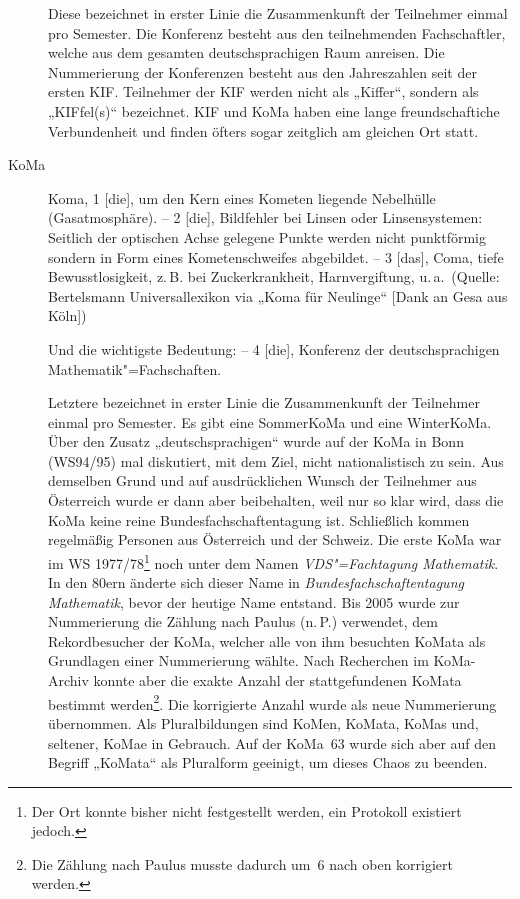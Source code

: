 \begin{description}
	Diese bezeichnet in erster Linie die Zusammenkunft der Teilnehmer einmal
	pro Semester. Die Konferenz besteht aus den teilnehmenden Fachschaftler,
	welche aus dem gesamten deutschsprachigen Raum anreisen. Die Nummerierung
	der Konferenzen besteht aus den Jahreszahlen seit der ersten KIF.\@
	Teilnehmer der KIF werden nicht als „Kiffer“, sondern als „KIFfel(s)“
	bezeichnet. KIF und KoMa haben eine lange freundschaftiche Verbundenheit
	und finden öfters sogar zeitglich am gleichen Ort statt.

\item[KoMa] Koma, 1 [die], um den Kern eines Kometen liegende Nebelhülle
	(Gasatmosphäre). -- 2 [die], Bildfehler bei Linsen oder Linsensystemen:
	Seitlich der optischen Achse gelegene Punkte werden nicht punktförmig
	sondern in Form eines Kometenschweifes abgebildet. -- 3 [das], Coma, tiefe
	Bewusstlosigkeit, z.\,B. bei Zuckerkrankheit, Harnvergiftung, u.\,a.\
	(Quelle: Bertelsmann Universallexikon via „Koma für Neulinge“ [Dank an Gesa
	aus Köln])

	Und die wichtigste Bedeutung: -- 4 [die], Konferenz der deutschsprachigen
	Mathematik"=Fachschaften.

	Letztere bezeichnet in erster Linie die Zusammenkunft der Teilnehmer einmal
	pro Semester. Es gibt eine SommerKoMa und eine WinterKoMa. Über den Zusatz
	„deutschsprachigen“ wurde auf der KoMa in Bonn (WS94/95) mal diskutiert,
	mit dem Ziel, nicht nationalistisch zu sein. Aus demselben Grund und auf
	ausdrücklichen Wunsch der Teilnehmer aus Österreich wurde er dann aber
	beibehalten, weil nur so klar wird, dass die KoMa keine reine
	Bundesfachschaftentagung ist. Schließlich kommen regelmäßig Personen aus
	Österreich und der Schweiz. Die erste KoMa war im WS 1977/78\footnote{Der
	Ort konnte bisher nicht festgestellt werden, ein Protokoll existiert
	jedoch.} noch unter dem Namen \emph{VDS"=Fachtagung Mathematik}. In den
	80ern änderte sich dieser Name in \emph{Bundesfachschaftentagung
	Mathematik}, bevor der heutige Name entstand.  Bis 2005 wurde zur
	Nummerierung die Zählung nach Paulus (n.\,P.) verwendet, dem Rekordbesucher
	der KoMa, welcher alle von ihm besuchten KoMata als Grundlagen einer
	Nummerierung wählte. Nach Recherchen im KoMa-Archiv konnte aber die exakte
	Anzahl der stattgefundenen KoMata bestimmt werden\footnote{Die Zählung nach
	Paulus musste dadurch um~6 nach oben korrigiert werden.}. Die korrigierte
	Anzahl wurde als neue Nummerierung übernommen.  Als Pluralbildungen sind
	KoMen, KoMata, KoMas und, seltener, KoMae in Gebrauch. Auf der KoMa~63
	wurde sich aber auf den Begriff „KoMata“ als Pluralform geeinigt, um dieses
	Chaos zu beenden.


\end{description}
